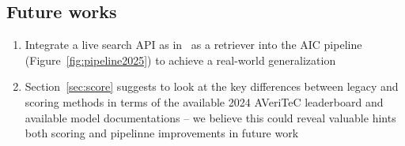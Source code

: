 \subsection{Future works}
\begin{enumerate}
    \item Integrate a live search API as in~\cite{malon-2024-multi} as a retriever into the AIC pipeline (Figure~\ref{fig:pipeline2025}) to achieve a real-world generalization
    \item Section~\ref{sec:score} suggests to look at the key differences between legacy and \evr{} scoring methods in terms of the available 2024 AVeriTeC leaderboard and available model documentations -- we believe this could reveal valuable hints both scoring and pipelinne improvements in future work
\end{enumerate}